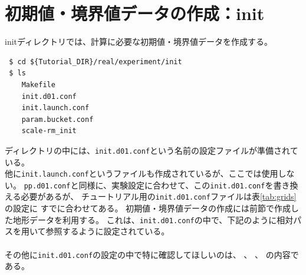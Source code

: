 \section{初期値・境界値データの作成：init} \label{sec:tutrial_real_init}

initディレクトリでは、\scalerm 計算に必要な初期値・境界値データを作成する。
\begin{verbatim}
 $ cd ${Tutorial_DIR}/real/experiment/init
 $ ls
    Makefile
    init.d01.conf
    init.launch.conf
    param.bucket.conf
    scale-rm_init
\end{verbatim}
ディレクトリの中には、\verb|init.d01.conf|という名前の設定ファイルが準備されている。\\
他に\verb|init.launch.conf|というファイルも作成されているが、ここでは使用しない。
\verb|pp.d01.conf|と同様に、実験設定に合わせて、この\verb|init.d01.conf|を書き換える必要があるが、
チュートリアル用の\verb|init.d01.conf|ファイルは表\ref{tab:grids}の設定に
すでに合わせてある。
初期値・境界値データの作成には前節で作成した地形データを利用する。
これは、\verb|init.d01.conf|の中で、下記のように相対パスを用いて参照するように設定されている。\\

\\

\noindent その他に\verb|init.d01.conf|の設定の中で特に確認してほしいのは、
、
、
の内容である。\\

